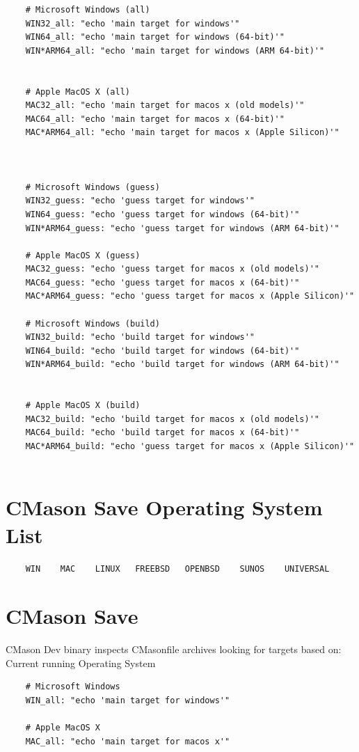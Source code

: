 \documentclass[]{article}
\begin{document}
\begin{verbatim}
	# Microsoft Windows (all)
	WIN32_all: "echo 'main target for windows'"
	WIN64_all: "echo 'main target for windows (64-bit)'"
	WIN*ARM64_all: "echo 'main target for windows (ARM 64-bit)'"
	
	
	# Apple MacOS X (all)
	MAC32_all: "echo 'main target for macos x (old models)'"
	MAC64_all: "echo 'main target for macos x (64-bit)'"
	MAC*ARM64_all: "echo 'main target for macos x (Apple Silicon)'"
	
	
	
	# Microsoft Windows (guess)
	WIN32_guess: "echo 'guess target for windows'"
	WIN64_guess: "echo 'guess target for windows (64-bit)'"
	WIN*ARM64_guess: "echo 'guess target for windows (ARM 64-bit)'"

	# Apple MacOS X (guess)
	MAC32_guess: "echo 'guess target for macos x (old models)'"
	MAC64_guess: "echo 'guess target for macos x (64-bit)'"
	MAC*ARM64_guess: "echo 'guess target for macos x (Apple Silicon)'"
	
	# Microsoft Windows (build)
	WIN32_build: "echo 'build target for windows'"
	WIN64_build: "echo 'build target for windows (64-bit)'"
	WIN*ARM64_build: "echo 'build target for windows (ARM 64-bit)'"
	
	
	# Apple MacOS X (build)
	MAC32_build: "echo 'build target for macos x (old models)'"
	MAC64_build: "echo 'build target for macos x (64-bit)'"
	MAC*ARM64_build: "echo 'guess target for macos x (Apple Silicon)'"
	
\end{verbatim}
\newpage

\section{CMason Save Operating System List}
\begin{verbatim}
	WIN    MAC    LINUX   FREEBSD   OPENBSD    SUNOS    UNIVERSAL
\end{verbatim}


\section{CMason Save}
CMason Dev binary inspects CMasonfile archives looking for targets based on: Current running Operating System

\begin{verbatim}
	# Microsoft Windows 
	WIN_all: "echo 'main target for windows'"
	
	# Apple MacOS X
	MAC_all: "echo 'main target for macos x'"
	
\end{verbatim}
\end{document}

